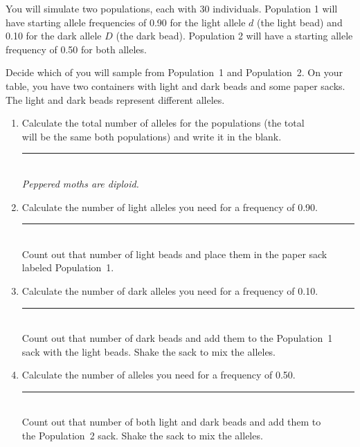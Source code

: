 \documentclass[12pt, hidelinks]{exam}
\newcommand{\allele}[1]{$#1$}
\begin{document}
\begin{questions}
You will simulate two populations, each with 30 individuals. Population 1 will have starting allele frequencies of 0.90 for the light allele \allele{d} (the light bead) and 0.10 for the dark allele \allele{D} (the dark bead). Population 2 will have a starting allele frequency of 0.50 for both alleles. 

Decide which of you will sample from Population~1 and Population~2. On your table, you have two containers with light and dark beads and some paper sacks. The light and dark beads represent different alleles.


\begin{enumerate}

	\item Calculate the total number of alleles for the populations (the total \\ 
	will be the same both populations) and write it in the blank. \hfill \rule{0.5in}{0.4pt}\\ \emph{Peppered moths are diploid.} 
	
	\item Calculate the number of light alleles you need for a frequency of 0.90. \hfill \rule{0.5in}{0.4pt} \\ Count out that number of light beads and place them in the paper sack\\ labeled Population~1. 
		
	\item Calculate the number of dark alleles you need for a frequency of 0.10. \hfill \rule{0.5in}{0.4pt} \\ Count out that number of dark beads and add them to the Population~1\\
	 sack with the light beads. Shake the sack to mix the alleles.

	\item Calculate the number of alleles you need for a frequency of 0.50. \hfill \rule{0.5in}{0.4pt} \\ Count out that number of both light and dark beads and add them to \\
	the Population~2 sack. Shake the sack to mix the alleles.


%	
%	


\end{enumerate}
\end{questions}
\end{document}
